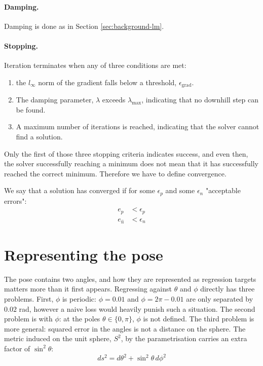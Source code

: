 \paragraph{Damping.} Damping is done as in Section \ref{sec:background-lm}.

\paragraph{Stopping.} Iteration terminates when any of three conditions are met:
\begin{enumerate}
  \item the $l_{\infty}$ norm of the gradient falls below a threshold, $\epsilon_{\mathrm{grad}}$.
  \item The damping parameter, $\lambda$ exceeds $\lambda_{\mathrm{max}}$, indicating that no downhill step can be found. 
  \item A maximum number of iterations is reached, indicating that the solver cannot find a solution.
\end{enumerate}
Only the first of those three stopping criteria indicates success, and even then, the solver successfully reaching a minimum does not mean that it has successfully reached the correct minimum. Therefore we have to define convergence.

We say that a solution has converged if for some $\epsilon_p$ and some $\epsilon_n$ "acceptable errors":
\begin{align*}
  e_p &< \epsilon_p \\
  e_{\hat{n}} &< \epsilon_n 
\end{align*}

\section{Representing the pose}\label{sec:representation}
The pose contains two angles, and how they are represented as regression targets matters more than it first appears. Regressing against $\theta$ and $\phi$ directly has three problems. First, $\phi$ is periodic: $\phi = 0.01$ and $\phi = 2\pi - 0.01$ are only separated by $0.02$ rad, however a naive loss would heavily punish such a situation. The second problem is with $\phi$: at the poles $\theta \in \{0,\pi\}$, $\phi$ is not defined. The third problem is more general: squared error in the angles is not a distance on the sphere. The metric induced on the unit sphere, $S^2$, by the parametrisation carries an extra factor of $\sin^2\theta$:
\begin{equation}
  ds^2 = d\theta^2 + \sin^2\theta \, d\phi^2 
\end{equation}

